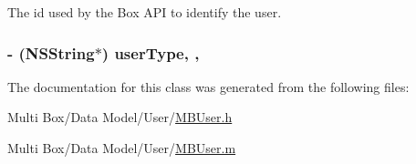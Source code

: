 The id used by the Box A\-P\-I to identify the user. 

\hypertarget{interface_m_b_user_a4baa5811f82638a002a7b57635f6b864}{
\subsubsection[{user\-Type}]{\setlength{\rightskip}{0pt plus 5cm}-\/ (N\-S\-String$\ast$) user\-Type\hspace{0.3cm}{\ttfamily [read]}, {\ttfamily [nonatomic]}, {\ttfamily [strong]}}}\label{interface_m_b_user_a4baa5811f82638a002a7b57635f6b864}


The documentation for this class was generated from the following files\-:\begin{DoxyCompactItemize}
\item 
Multi Box/\-Data Model/\-User/\hyperlink{_m_b_user_8h}{M\-B\-User.\-h}\item 
Multi Box/\-Data Model/\-User/\hyperlink{_m_b_user_8m}{M\-B\-User.\-m}\end{DoxyCompactItemize}
